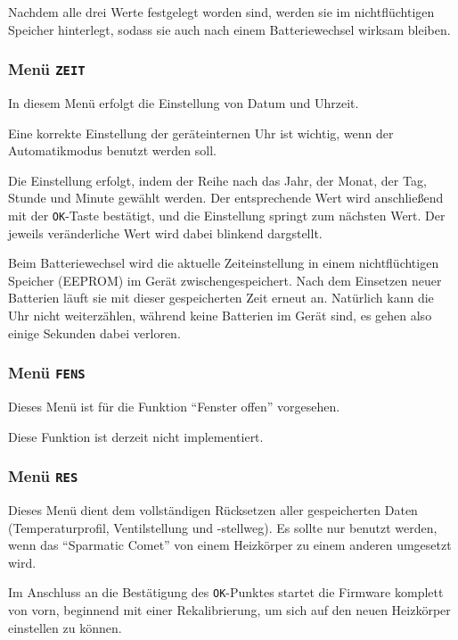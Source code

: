 \documentclass[a4paper]{article}
\newcommand\SC{"`Sparmatic Comet"' }
\begin{document}
Nachdem alle drei Werte festgelegt worden sind, werden sie im
nichtflüchtigen Speicher hinterlegt, sodass sie auch nach einem
Batteriewechsel wirksam bleiben.

\subsubsection {
  Menü \texttt{ZEIT}\label{menu:zeit}
}

In diesem Menü erfolgt die Einstellung von Datum und Uhrzeit.

Eine korrekte Einstellung der geräteinternen Uhr ist wichtig, wenn
der Automatikmodus benutzt werden soll.

Die Einstellung erfolgt, indem der Reihe nach das Jahr, der Monat,
der Tag, Stunde und Minute gewählt werden.  Der entsprechende Wert
wird anschließend mit der \texttt{OK}-Taste bestätigt, und die
Einstellung springt zum nächsten Wert.  Der jeweils veränderliche
Wert wird dabei blinkend dargstellt.

Beim Batteriewechsel wird die aktuelle Zeiteinstellung in einem
nichtflüchtigen Speicher (EEPROM) im Gerät zwischengespeichert.  Nach
dem Einsetzen neuer Batterien läuft sie mit dieser gespeicherten Zeit
erneut an.  Natürlich kann die Uhr nicht weiterzählen, während keine
Batterien im Gerät sind, es gehen also einige Sekunden dabei
verloren.

\subsubsection {
  Menü \texttt{FENS}
}

Dieses Menü ist für die Funktion "`Fenster offen"' vorgesehen.

Diese Funktion ist derzeit nicht implementiert.

\subsubsection {
  Menü \texttt{RES}\label{menu:res}
}

Dieses Menü dient dem vollständigen Rücksetzen aller gespeicherten
Daten (Temperaturprofil, Ventilstellung und -stellweg).  Es sollte nur
benutzt werden, wenn das \SC von einem Heizkörper zu einem anderen
umgesetzt wird.

Im Anschluss an die Bestätigung des \texttt{OK}-Punktes startet die
Firmware komplett von vorn, beginnend mit einer Rekalibrierung, um
sich auf den neuen Heizkörper einstellen zu können.
\end{document}
